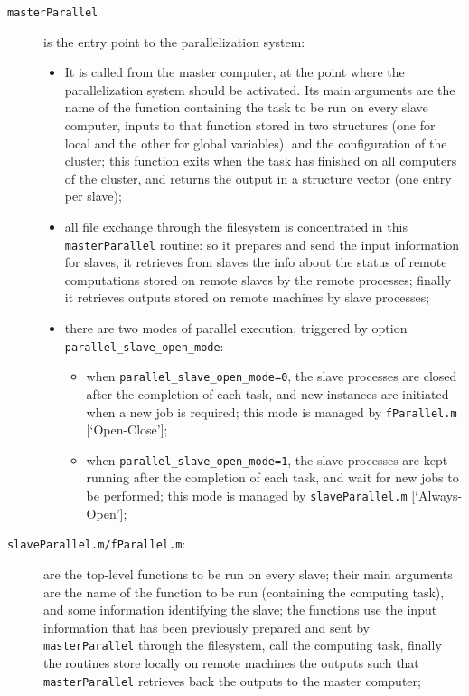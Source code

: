 \documentclass[12pt,a4paper,pdftex]{article}
\begin{document}
\begin{description}
 \item[\texttt{masterParallel}] is the entry point to the parallelization system:
 \begin{itemize}
  \item It is called from the master computer, at the point where the parallelization system should be activated. Its main arguments are the name of the function containing the task to be run on every slave computer, inputs to that function stored in two structures (one for local and the other for global variables), and the configuration of the cluster; this function exits when the task has finished on all computers of the cluster, and returns the output in a structure vector (one entry per slave);
  \item all file exchange through the filesystem is concentrated in this \verb"masterParallel" routine: so it prepares and send the input information for slaves, it retrieves from slaves the info about the status of remote computations stored on remote slaves by the remote processes; finally it retrieves outputs stored on remote machines by slave processes;
  \item there are two modes of parallel execution, triggered by option \verb"parallel_slave_open_mode":
   \begin{itemize}
   \item when \verb"parallel_slave_open_mode=0", the slave processes are closed after the completion of each task, and new instances are initiated when a new job is required; this mode is managed by \verb"fParallel.m" [`Open-Close'];
   \item when \verb"parallel_slave_open_mode=1", the slave processes are kept running after the completion of each task, and wait for new jobs to be performed; this mode is managed by \texttt{slaveParallel.m} [`Always-Open'];
   \end{itemize}
  \end{itemize}
 \item[\texttt{slaveParallel.m/fParallel.m}:] are the top-level functions to be run on every slave; their main arguments are the name of the function to be run (containing the computing task), and some information identifying the slave; the functions use the input information that has been previously prepared and sent by \verb"masterParallel" through the filesystem, call the computing task, finally the routines store locally on remote machines the  outputs such that \verb"masterParallel" retrieves back the outputs to the master computer;

\end{description}
\end{document}
